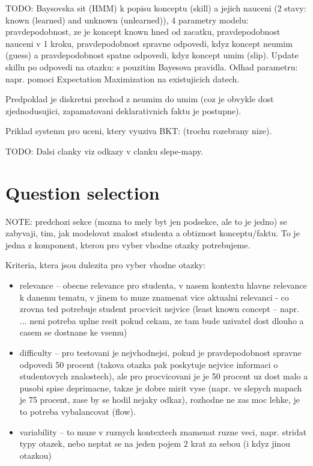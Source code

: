 \documentclass[a4paper, 12pt, twoside]{fithesis2}		%
\renewcommand{\_}{\leavevmode \kern0.0em\vbox{\hrule width0.4em}}
\newcommand{\squarebullet}{\textcolor{black}{\raisebox{0.15em}{\rule{4pt}{4pt}}}}
\newenvironment{myItemize}{
  \begin{itemize}[leftmargin=2em,rightmargin=1em,itemsep=\parskip ,parsep=0em,topsep=0em,partopsep=0em]
  \renewcommand{\labelitemi}{\squarebullet}
  \renewcommand{\labelitemii}{$\diamond$}
}{
  \end{itemize}
}
\begin{document}
TODO: Baysovska sit (HMM) k popisu konceptu (skill) a jejich nauceni (2 stavy: known (learned) and unknown (unlearned)), 4 parametry modelu: pravdepodobnost, ze je koncept known hned od zacatku, pravdepodobnost nauceni v 1 kroku, pravdepodobnost spravne odpovedi, kdyz koncept neumim (guess) a pravdepodobnost spatne odpovedi, kdyz koncept umim (slip).
Update skillu po odpovedi na otazku: s pouzitim Bayesova pravidla.
Odhad parametru: napr. pomoci Expectation Maximization na existujicich datech.

Predpoklad je diskretni prechod z neumim do umim (coz je obvykle dost zjednodusujici, zapamatovani deklarativnich faktu je postupne).

Priklad systemu pro uceni, ktery vyuziva BKT: \cite{question-gen-adapt-bayes} (trochu rozebrany nize).

TODO: Dalsi clanky viz odkazy v clanku slepe-mapy.


\section{Question selection}
\label{sec:question-selection}

NOTE: predchozi sekce (mozna to mely byt jen podsekce, ale to je jedno) se zabyvaji, tim, jak modelovat znalost studenta a obtiznost konceptu/faktu. To je jedna z komponent, kterou pro vyber vhodne otazky potrebujeme.

Kriteria, ktera jsou dulezita pro vyber vhodne otazky:

\begin{myItemize}
  \item relevance -- obecne relevance pro studenta, v nasem kontextu hlavne relevance k danemu tematu, v jinem to muze znamenat vice aktualni relevanci - co zrovna ted potrebuje student procvicit nejvice (least known concept -- napr. \cite{question-gen-adapt-bayes} ... neni potreba uplne resit pokud cekam, ze tam bude uzivatel dost dlouho a casem se dostnane ke vsemu)
  \item difficulty -- pro testovani je nejvhodnejsi, pokud je pravdepodobnost spravne odpovedi 50 procent (takova otazka pak poskytuje nejvice informaci o studentovych znalostech), ale pro procvicovani je je 50 procent uz dost malo a pusobi spise deprimacne, takze je dobre mirit vyse (napr. ve slepych mapach je 75 procent, zase by se hodil nejaky odkaz), rozhodne ne zas moc lehke, je to potreba vybalancovat (flow).
  \item variability -- to muze v ruznych kontextech znamenat ruzne veci, napr. stridat typy otazek, nebo neptat se na jeden pojem 2 krat za sebou (i kdyz jinou otazkou)
\end{myItemize}
\end{document}
